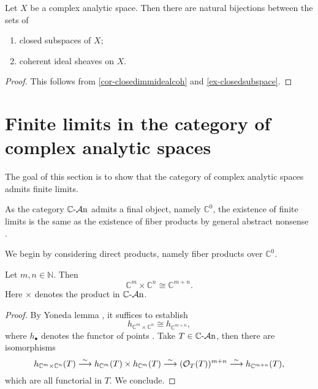 \begin{corollary}
    Let $X$ be a complex analytic space. Then there are natural bijections between the sets of
    \begin{enumerate}
        \item closed subspaces of $X$;
        \item coherent ideal sheaves on $X$.
    \end{enumerate}
\end{corollary}
\begin{proof}
    This follows from \cref{cor-closedimmidealcoh} and \cref{ex-closedsubspace}.
\end{proof}


\section{Finite limits in the category of complex analytic spaces}

The goal of this section is to show that the category of complex analytic spaces admits finite limits.

As the category $\mathbb{C}\text{-}\mathcal{A}\mathrm{n}$ admits a final object, namely $\mathbb{C}^0$, the existence of finite limits is the same as the existence of fiber products by general abstract nonsense \cite[\href{https://stacks.math.columbia.edu/tag/002O}{Tag 002O}]{stacks-project}.

We begin by considering direct products, namely fiber products over $\mathbb{C}^0$. 

\begin{lemma}\label{lma-CmCnproductexist}
Let $m,n\in \mathbb{N}$. Then 
\[
    \mathbb{C}^m\times \mathbb{C}^n\cong \mathbb{C}^{m+n}. 
\]    
Here $\times$ denotes the product in $\mathbb{C}\text{-}\mathcal{A}\mathrm{n}$.
\end{lemma}
\begin{proof}
    By Yoneda lemma \cite[\href{https://stacks.math.columbia.edu/tag/001P}{Tag 001P}]{stacks-project}, it suffices to establish
    \[
        h_{\mathbb{C}^m\times \mathbb{C}^n}\cong h_{\mathbb{C}^{m+n}},
    \]
    where $h_{\bullet}$ denotes the functor of points \cite[\href{https://stacks.math.columbia.edu/tag/001O}{Tag 001O}]{stacks-project}. Take $T\in \mathbb{C}\text{-}\mathcal{A}\mathrm{n}$, then there are isomorphisms
    \[
        h_{\mathbb{C}^m\times \mathbb{C}^n}(T)\stackrel{\sim}{\longrightarrow} h_{\mathbb{C}^m}(T)\times h_{\mathbb{C}^m}(T)\stackrel{\sim}{\longrightarrow} (\mathcal{O}_{T}(T))^{m+n}\stackrel{\sim}{\longrightarrow}   h_{\mathbb{C}^{m+n}}(T),
    \]
    which are all functorial in $T$. We conclude.
\end{proof}

